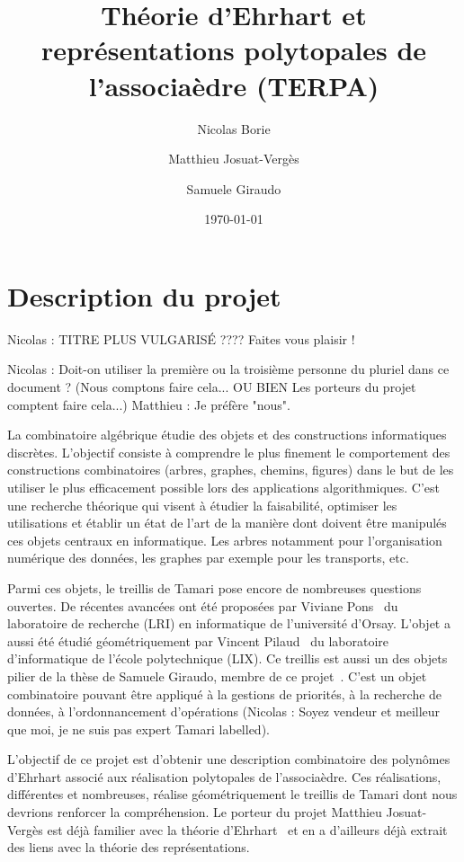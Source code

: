 \documentclass[a4paper, 10pt]{article}
\title{Théorie d'Ehrhart et représentations polytopales de
l'associaèdre (TERPA)}
\date{\today}
\author{Nicolas Borie \and Matthieu Josuat-Verg\`es \and Samuele Giraudo}
\numberwithin{equation}{subsection}
\begin{document}
\maketitle

\section{Description du projet}

Nicolas : TITRE PLUS VULGARISÉ ???? Faites vous plaisir !

Nicolas : Doit-on utiliser la première ou la troisième personne du pluriel dans ce document ?
(Nous comptons faire cela... OU BIEN Les porteurs du projet comptent faire cela...)
Matthieu : Je préfère "nous".

La combinatoire algébrique étudie des objets et des constructions
informatiques discrètes. L'objectif consiste à comprendre le plus
finement le comportement des constructions combinatoires (arbres,
graphes, chemins, figures) dans le but de les utiliser le plus
efficacement possible lors des applications algorithmiques. C'est une
recherche théorique qui visent à étudier la faisabilité, optimiser les
utilisations et établir un état de l'art de la manière dont doivent
être manipulés ces objets centraux en informatique. Les arbres
notamment pour l'organisation numérique des données, les graphes par
exemple pour les transports, etc.



Parmi ces objets, le treillis de Tamari pose encore de nombreuses
questions ouvertes. De récentes avancées ont été proposées par Viviane
Pons~\cite{MR3345297} du laboratoire de recherche (LRI) en
informatique de l'université d'Orsay. L'objet a aussi été étudié
géométriquement par Vincent Pilaud~\cite{MR3327085} du laboratoire
d'informatique de l'école polytechnique (LIX). Ce treillis est aussi
un des objets pilier de la thèse de Samuele Giraudo, membre de ce
projet~\cite{MR2887627}. C'est un objet combinatoire pouvant être
appliqué à la gestions de priorités, à la recherche de données, à
l'ordonnancement d'opérations (Nicolas : Soyez vendeur et meilleur que
moi, je ne suis pas expert Tamari labelled).



L'objectif de ce projet est d'obtenir une description combinatoire des
polynômes d'Ehrhart associé aux réalisation polytopales de
l'associaèdre. Ces réalisations, différentes et nombreuses, réalise
géométriquement le treillis de Tamari dont nous devrions renforcer la
compréhension. Le porteur du projet Matthieu Josuat-Vergès est déjà
familier avec la théorie d'Ehrhart~\cite{MR3484760} et en a d'ailleurs
déjà extrait des liens avec la théorie des représentations.
\end{document}
